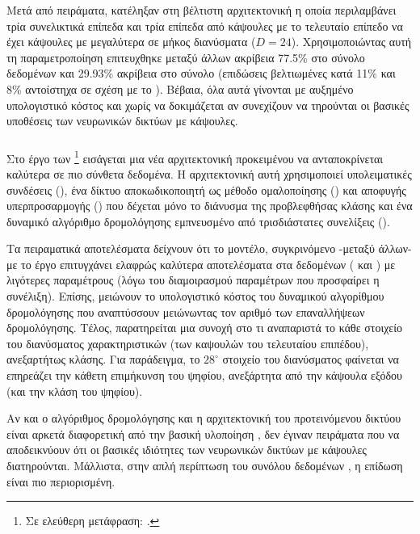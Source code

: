 Μετά από πειράματα, κατέληξαν στη βέλτιστη αρχιτεκτονική η οποία περιλαμβάνει τρία συνελικτικά επίπεδα και τρία επίπεδα από κάψουλες με το τελευταίο επίπεδο να έχει κάψουλες με μεγαλύτερα σε μήκος διανύσματα ($D=24$). Χρησιμοποιώντας αυτή τη παραμετροποίηση επιτευχθηκε μεταξύ άλλων ακρίβεια 77.5\% στο σύνολο δεδομένων  και 29.93\% ακρίβεια στο σύνολο  (επιδώσεις βελτιωμένες κατά 11\% και 8\% αντοίστηχα σε σχέση με το \cite{sabour2017dynamic}). Βέβαια, όλα αυτά γίνονται με αυξημένο υπολογιστικό κόστος και χωρίς να δοκιμάζεται αν συνεχίζουν να τηρούνται οι βασικές υποθέσεις των νευρωνικών δικτύων με κάψουλες.

\subsubsection{}

Στο έργο των  \footnote{Σε ελεύθερη μετάφραση: .} \cite{rajasegaran2019deepcaps} εισάγεται μια νέα αρχιτεκτονική προκειμένου να ανταποκρίνεται καλύτερα σε πιο σύνθετα δεδομένα. Η αρχιτεκτονική αυτή χρησιμοποιεί υπολειματικές συνδέσεις (), ένα δίκτυο αποκωδικοποιητή ως μέθοδο ομαλοποίησης () και αποφυγής υπερπροσαρμογής () που δέχεται μόνο το διάνυσμα της προβλεφθήσας κλάσης και ένα δυναμικό αλγόριθμο δρομολόγησης εμπνευσμένο από τρισδιάστατες συνελίξεις (). \par

Τα πειραματικά αποτελέσματα δείχνουν ότι το μοντέλο, συγκρινόμενο -μεταξύ άλλων- με το έργο \cite{sabour2017dynamic} επιτυγχάνει ελαφρώς καλύτερα αποτελέσματα στα δεδομένων ( και ) με λιγότερες παραμέτρους (λόγω του διαμοιρασμού παραμέτρων που προσφαίρει η συνέλιξη). Επίσης, μειώνουν το υπολογιστικό κόστος του δυναμικού αλγορίθμου δρομολόγησης που αναπτύσσουν μειώνωντας τον αριθμό των επαναλλήψεων δρομολόγησης. Τέλος, παρατηρείται μια συνοχή στο τι αναπαριστά το κάθε στοιχείο του διανύσματος χαρακτηριστικών (των καψουλών του τελευταίου επιπέδου), ανεξαρτήτως κλάσης. Για παράδειγμα, το $28^\circ$ στοιχείο του διανύσματος φαίνεται να επηρεάζει την κάθετη επιμήκυνση του ψηφίου, ανεξάρτητα από την κάψουλα εξόδου (και την κλάση του ψηφίου). \par

Αν και ο αλγόριθμος δρομολόγησης και η αρχιτεκτονική του προτεινόμενου δικτύου είναι αρκετά διαφορετική από την βασική υλοποίηση \cite{sabour2017dynamic}, δεν έγιναν πειράματα που να αποδεικνύουν ότι οι βασικές ιδιότητες των νευρωνικών δικτύων με κάψουλες διατηρούνται. Μάλλιστα, στην απλή περίπτωση του συνόλου δεδομένων , η επίδωση είναι πιο περιορισμένη.


